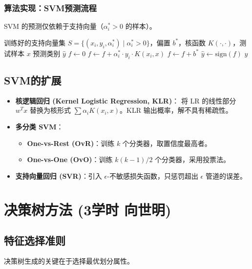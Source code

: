 \documentclass[a4paper, 11pt]{ctexart}
\begin{document}
\subsubsection{算法实现：SVM预测流程}
SVM 的预测仅依赖于支持向量（$\alpha_i^* > 0$ 的样本）。

\begin{algorithm}[H]
    \caption{基于核函数的SVM预测算法}
    \begin{algorithmic}[1]
    \Require 训练好的支持向量集 $S = \{(x_i, y_i, \alpha_i^*) \mid \alpha_i^* > 0\}$，偏置 $b^*$，核函数 $K(\cdot, \cdot)$，测试样本 $x$
    \Ensure 预测类别 $\hat{y}$
    \State $f \gets 0$
        \State $f \gets f + \alpha_i^* \cdot y_i \cdot K(x_i, x)$ 
    \EndFor
    \State $f \gets f + b^*$
    \State $\hat{y} \gets \text{sign}(f)$
    \State \Return $\hat{y}$
    \end{algorithmic}
\end{algorithm}

\subsection{SVM的扩展}
\begin{itemize}
    \item \textbf{核逻辑回归 (Kernel Logistic Regression, KLR)}：
    将 LR 的线性部分 $w^T x$ 替换为核形式 $\sum \alpha_i K(x_i, x)$。KLR 输出概率，解不具有稀疏性。
    \item \textbf{多分类 SVM}：
    \begin{itemize}
        \item \textbf{One-vs-Rest (OvR)}：训练 $k$ 个分类器，取置信度最高者。
        \item \textbf{One-vs-One (OvO)}：训练 $k(k-1)/2$ 个分类器，采用投票法。
    \end{itemize}
    \item \textbf{支持向量回归 (SVR)}：引入 $\epsilon$-不敏感损失函数，只惩罚超出 $\epsilon$ 管道的误差。
\end{itemize}

\newpage
\section{决策树方法 \small{(3学时 向世明)}}

\subsection{特征选择准则}
决策树生成的关键在于选择最优划分属性。
\end{document}
